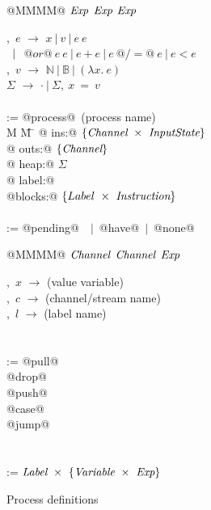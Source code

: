 
\begin{figure}
\begin{minipage}[t]{0.4\textwidth}
\begin{tabbing}
\Instr \TABDEF @MMMM@  \TABSKIP $\textit{Exp}$ \TABSKIP $\textit{Exp}$ \TABSKIP $\textit{Exp}$ \kill

\Exp,~$e$ \> $\to$ \> $x~|~v~|~e~e $ \\
  \> $\enskip|~$ \> $ @or@~e~e ~|~ e+e ~|~ e~@/=@~e ~|~ e < e$ \\
\Value,~$v$ \> $\to$ \> $\mathbb{N}~|~\mathbb{B}~|~(\lambda{}x.~e)$ \\
$\Sigma$ \> $\to$ \> $\cdot~|~\Sigma,~x~=~v$ \\
\\

\Proc \>:=\> @process@~(process name) \\
M \= M \= \kill
\> \> @   ins:@  $\{\textit{Channel} ~\times~ \textit{InputState}\}$ \\
\> \> @  outs:@  $\{ \textit{Channel} \}$ \\
\> \> @  heap:@  $\Sigma$ \\
\> \> @ label:@  \Label \\
\> \> @blocks:@  $\{Label ~\times~ \textit{Instruction}\}$ \\
\\
\Instr \TABDEF \kill
\InputState \> := \> @pending@~\Value~$|$~@have@~$|$~@none@

\end{tabbing}
\end{minipage}
\begin{minipage}[t]{0.05\textwidth}
\quad
\end{minipage}
\begin{minipage}[t]{0.4\textwidth}
\begin{tabbing}
\Instr \TABDEF @MMMM@  \TABSKIP $\textit{Channel}$ \TABSKIP $\textit{Channel}$ \TABSKIP $\textit{Exp}$ \kill

\Var,~$x$ \> $\to$ \> (value variable) \\
\Chan,~$c$ \> $\to$ \> (channel/stream name) \\
\Label,~$l$ \> $\to$ \> (label name) \\
\\
\\

\Instr
    \> :=\> @pull@  \> \Chan  \> \Var  \> \Next \\
    \TABALT @drop@  \> \Chan  \>       \> \Next \\
    \TABALT @push@  \> \Chan  \> \Exp  \> \Next \\
    \TABALT @case@  \> \Exp   \> \Next \> \Next \\
    \TABALT @jump@  \>        \>       \> \Next \\
\\
\\
\Next \> := \> $\textit{Label}~\times~\{\textit{Variable} ~\times~ \textit{Exp}\}$ \\
\end{tabbing}
\end{minipage}

\caption{Process definitions}
\label{fig:Process:Def}
\end{figure}


